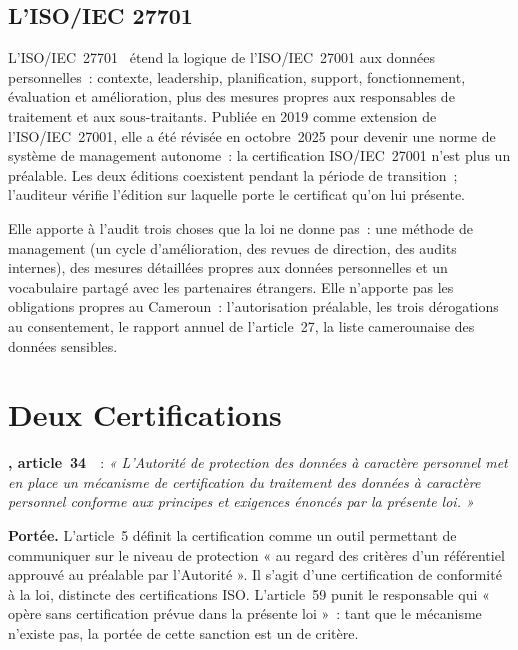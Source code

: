 \subsection{L'ISO/IEC 27701}

L'ISO/IEC~27701~\cite{iso27701} étend la logique de l'ISO/IEC~27001 aux
données personnelles~: contexte, leadership, planification, support,
fonctionnement, évaluation et amélioration, plus des mesures propres aux
responsables de traitement et aux sous-traitants. Publiée en 2019 comme
extension de l'ISO/IEC~27001, elle a été révisée en octobre~2025 pour
devenir une norme de système de management autonome~: la certification
ISO/IEC~27001 n'est plus un préalable. Les deux éditions coexistent pendant
la période de transition~; l'auditeur vérifie l'édition sur laquelle porte
le certificat qu'on lui présente.

Elle apporte à l'audit trois choses que la loi ne donne pas~: une méthode
de management (un cycle d'amélioration, des revues de direction, des
audits internes), des mesures détaillées propres aux données personnelles
et un vocabulaire partagé avec les partenaires étrangers. Elle n'apporte
pas les obligations propres au Cameroun~: l'autorisation préalable, les
trois dérogations au consentement, le rapport annuel de l'article~27, la
liste camerounaise des données sensibles.

\section{Deux Certifications}
\label{sec:c05-certification}

\begin{boxjuris}
\textbf{, article~34}~\cite{loi2024017}~:
\textit{« L'Autorité de protection des données à caractère personnel met en
place un mécanisme de certification du traitement des données à caractère
personnel conforme aux principes et exigences énoncés par la présente
loi. »}

\smallskip
\textbf{Portée.} L'article~5 définit la certification comme un outil
permettant de communiquer sur le niveau de protection « au regard des
critères d'un référentiel approuvé au préalable par l'Autorité ». Il s'agit
d'une certification de conformité à la loi, distincte des certifications
ISO. L'article~59 punit le responsable qui « opère sans certification
prévue dans la présente loi »~: tant que le mécanisme n'existe pas, la
portée de cette sanction est un \NEK{} de critère.
\end{boxjuris}

